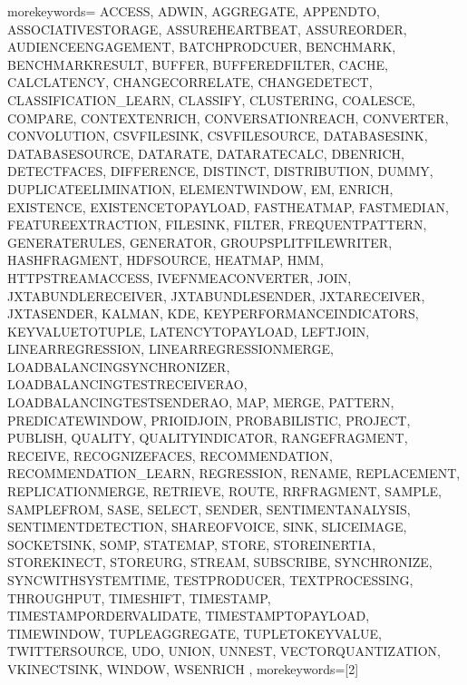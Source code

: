 
%
   {morekeywords={%
ACCESS, ADWIN, AGGREGATE, APPENDTO, ASSOCIATIVESTORAGE, ASSUREHEARTBEAT, ASSUREORDER, AUDIENCEENGAGEMENT, BATCHPRODCUER, BENCHMARK, BENCHMARKRESULT, BUFFER, BUFFEREDFILTER, CACHE, CALCLATENCY, CHANGECORRELATE, CHANGEDETECT, CLASSIFICATION_LEARN, CLASSIFY, CLUSTERING, COALESCE, COMPARE, CONTEXTENRICH, CONVERSATIONREACH, CONVERTER, CONVOLUTION, CSVFILESINK, CSVFILESOURCE, DATABASESINK, DATABASESOURCE, DATARATE, DATARATECALC, DBENRICH, DETECTFACES, DIFFERENCE, DISTINCT, DISTRIBUTION, DUMMY, DUPLICATEELIMINATION, ELEMENTWINDOW, EM, ENRICH, EXISTENCE, EXISTENCETOPAYLOAD, FASTHEATMAP, FASTMEDIAN, FEATUREEXTRACTION, FILESINK, FILTER, FREQUENTPATTERN, GENERATERULES, GENERATOR, GROUPSPLITFILEWRITER, HASHFRAGMENT, HDFSOURCE, HEATMAP, HMM, HTTPSTREAMACCESS, IVEFNMEACONVERTER, JOIN, JXTABUNDLERECEIVER, JXTABUNDLESENDER, JXTARECEIVER, JXTASENDER, KALMAN, KDE, KEYPERFORMANCEINDICATORS, KEYVALUETOTUPLE, LATENCYTOPAYLOAD, LEFTJOIN, LINEARREGRESSION, LINEARREGRESSIONMERGE, LOADBALANCINGSYNCHRONIZER, LOADBALANCINGTESTRECEIVERAO, LOADBALANCINGTESTSENDERAO, MAP, MERGE, PATTERN, PREDICATEWINDOW, PRIOIDJOIN, PROBABILISTIC, PROJECT, PUBLISH, QUALITY, QUALITYINDICATOR, RANGEFRAGMENT, RECEIVE, RECOGNIZEFACES, RECOMMENDATION, RECOMMENDATION_LEARN, REGRESSION, RENAME, REPLACEMENT, REPLICATIONMERGE, RETRIEVE, ROUTE, RRFRAGMENT, SAMPLE, SAMPLEFROM, SASE, SELECT, SENDER, SENTIMENTANALYSIS, SENTIMENTDETECTION, SHAREOFVOICE, SINK, SLICEIMAGE, SOCKETSINK, SOMP, STATEMAP, STORE, STOREINERTIA, STOREKINECT, STOREURG, STREAM, SUBSCRIBE, SYNCHRONIZE, SYNCWITHSYSTEMTIME, TESTPRODUCER, TEXTPROCESSING, THROUGHPUT, TIMESHIFT, TIMESTAMP, TIMESTAMPORDERVALIDATE, TIMESTAMPTOPAYLOAD, TIMEWINDOW, TUPLEAGGREGATE, TUPLETOKEYVALUE, TWITTERSOURCE, UDO, UNION, UNNEST, VECTORQUANTIZATION, VKINECTSINK, WINDOW, WSENRICH%
      },%
   morekeywords=[2]{%
}}
